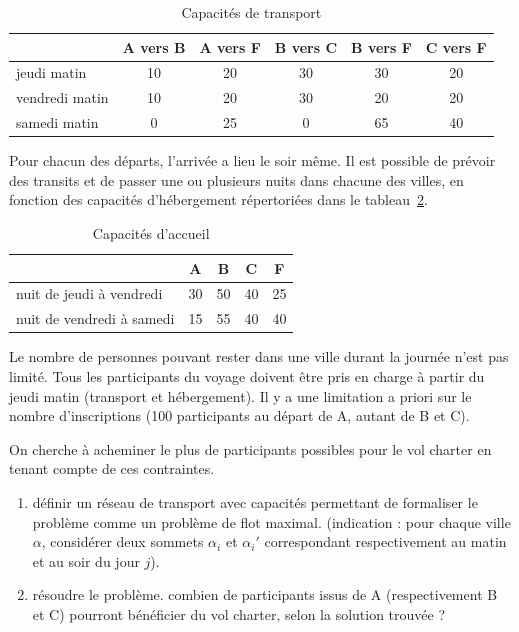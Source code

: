 \documentclass[paper=a4, fontsize=11pt]{scrartcl} %
\numberwithin{equation}{section} %
\numberwithin{figure}{section} %
\numberwithin{table}{section} %
\begin{document}
\begin{table}[htbp]
  \begin{center}
    \begin{tabular}{|l|ccccc|}
      \hline
      & A vers B & A vers F & B vers C & B vers F & C vers F \\
     \hline 
      jeudi matin & 10 & 20 & 30 & 30 & 20 \\
      vendredi matin & 10 & 20 & 30 & 20 & 20 \\
      samedi matin & 0 & 25 & 0 & 65 & 40 \\
      \hline
    \end{tabular}
    \caption{Capacités de transport}
    \label{tab:vol}
  \end{center}
\end{table}

Pour chacun des départs, l'arrivée a lieu le soir même. Il est
possible de prévoir des transits et de passer une ou plusieurs nuits
dans chacune des villes, en fonction des capacités d'hébergement
répertoriées dans le tableau~\ref{tab:nuit}.

\begin{table}[htbp]
  \begin{center}
    \begin{tabular}{|l|cccc|}
      \hline
      & A & B & C & F \\
      \hline
      nuit de jeudi à vendredi & 30 & 50 & 40 & 25 \\
      nuit de vendredi à samedi & 15 & 55 & 40 & 40 \\
      \hline
    \end{tabular}
    \caption{Capacités d'accueil}
    \label{tab:nuit}
  \end{center}
\end{table}

Le nombre de personnes pouvant rester dans une ville durant la journée
n'est pas limité. Tous les participants du voyage doivent être pris en
charge à partir du jeudi matin (transport et hébergement). Il y a une
limitation a priori sur le nombre d'inscriptions (100 participants au
départ de A, autant de B et C). 

On cherche à acheminer le plus de participants possibles pour le vol
charter en tenant compte de ces contraintes.

\begin{enumerate}
\item définir un réseau de transport avec capacités permettant de
   formaliser le problème comme un problème de flot
   maximal. (indication : pour chaque ville $\alpha$, considérer deux
   sommets $\alpha_i$ et $\alpha_i'$ correspondant respectivement au
   matin et au soir du jour $j$).

\item résoudre le problème. combien de participants issus de A
   (respectivement B et C) pourront bénéficier du vol charter, selon
   la solution trouvée ?
\end{enumerate}
\end{document}
